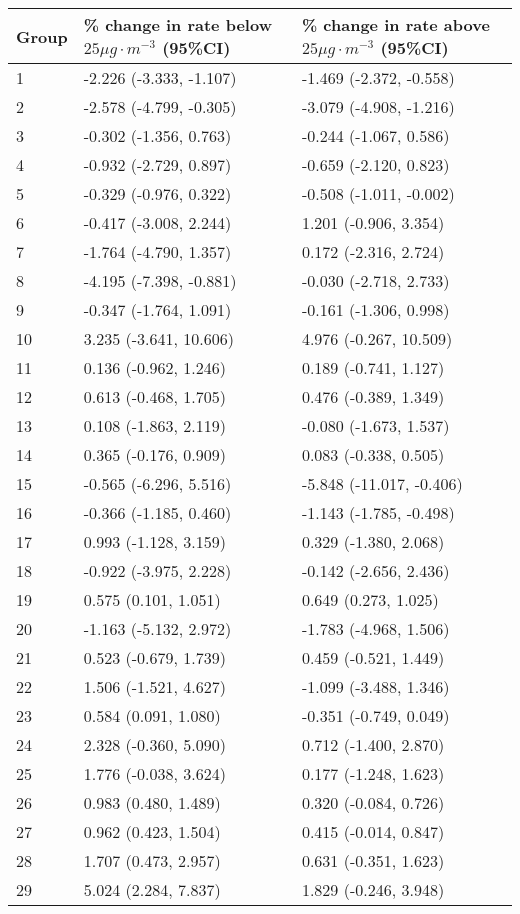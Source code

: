 \begin{tabular}{lll}
  \hline
Group & \% change in rate below $25 \mu g \cdot m^{-3}$ (95\%CI) & \% change in rate above $25 \mu g \cdot m^{-3}$ (95\%CI) \\ 
  \hline
   1 & -2.226 (-3.333, -1.107) & -1.469 (-2.372, -0.558) \\ 
     2 & -2.578 (-4.799, -0.305) & -3.079 (-4.908, -1.216) \\ 
     3 & -0.302 (-1.356, 0.763) & -0.244 (-1.067, 0.586) \\ 
     4 & -0.932 (-2.729, 0.897) & -0.659 (-2.120, 0.823) \\ 
     5 & -0.329 (-0.976, 0.322) & -0.508 (-1.011, -0.002) \\ 
     6 & -0.417 (-3.008, 2.244) & 1.201 (-0.906, 3.354) \\ 
     7 & -1.764 (-4.790, 1.357) & 0.172 (-2.316, 2.724) \\ 
     8 & -4.195 (-7.398, -0.881) & -0.030 (-2.718, 2.733) \\ 
     9 & -0.347 (-1.764, 1.091) & -0.161 (-1.306, 0.998) \\ 
    10 & 3.235 (-3.641, 10.606) & 4.976 (-0.267, 10.509) \\ 
    11 & 0.136 (-0.962, 1.246) & 0.189 (-0.741, 1.127) \\ 
    12 & 0.613 (-0.468, 1.705) & 0.476 (-0.389, 1.349) \\ 
    13 & 0.108 (-1.863, 2.119) & -0.080 (-1.673, 1.537) \\ 
    14 & 0.365 (-0.176, 0.909) & 0.083 (-0.338, 0.505) \\ 
    15 & -0.565 (-6.296, 5.516) & -5.848 (-11.017, -0.406) \\ 
    16 & -0.366 (-1.185, 0.460) & -1.143 (-1.785, -0.498) \\ 
    17 & 0.993 (-1.128, 3.159) & 0.329 (-1.380, 2.068) \\ 
    18 & -0.922 (-3.975, 2.228) & -0.142 (-2.656, 2.436) \\ 
    19 & 0.575 (0.101, 1.051) & 0.649 (0.273, 1.025) \\ 
    20 & -1.163 (-5.132, 2.972) & -1.783 (-4.968, 1.506) \\ 
    21 & 0.523 (-0.679, 1.739) & 0.459 (-0.521, 1.449) \\ 
    22 & 1.506 (-1.521, 4.627) & -1.099 (-3.488, 1.346) \\ 
    23 & 0.584 (0.091, 1.080) & -0.351 (-0.749, 0.049) \\ 
    24 & 2.328 (-0.360, 5.090) & 0.712 (-1.400, 2.870) \\ 
    25 & 1.776 (-0.038, 3.624) & 0.177 (-1.248, 1.623) \\ 
    26 & 0.983 (0.480, 1.489) & 0.320 (-0.084, 0.726) \\ 
    27 & 0.962 (0.423, 1.504) & 0.415 (-0.014, 0.847) \\ 
    28 & 1.707 (0.473, 2.957) & 0.631 (-0.351, 1.623) \\ 
    29 & 5.024 (2.284, 7.837) & 1.829 (-0.246, 3.948) \\ 
   \hline
\end{tabular}

